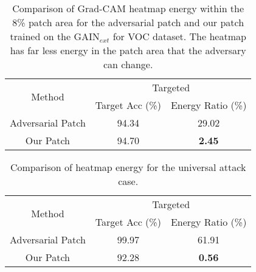 \documentclass[10pt,twocolumn,letterpaper]{article}
\begin{document}
\begin{table}[!t]
\centering
 \begin{tabular}{||c || c | c ||}
 \hline
 \multirow{2}{*}{Method} & \multicolumn{2}{|c|}{Targeted} \\ [0.5ex]
 \cline{2-3}
 & \footnotesize{Target Acc (\%)} & \footnotesize{Energy Ratio (\%)}\\
 \hline\hline
 Adversarial Patch \cite{brown2017adversarial} & 94.34 & 29.02   \\
 \hline
 Our Patch & 94.70 & \textbf{2.45} \\
 \hline
\end{tabular}
\newline
    \caption{Comparison of Grad-CAM heatmap energy within the 8\% patch area for the adversarial patch \cite{brown2017adversarial} and our patch trained on the GAIN{$_{ext}$} \cite{kunpeng2018gain} for VOC dataset. The heatmap has far less energy in the patch area that the adversary can change.
    }
    \label{fig:comparison_patch_heatmap_GAIN}
\end{table}
\begin{table}[!t]
\centering
 \begin{tabular}{||c || c | c ||}
 \hline
 \multirow{2}{*}{Method} & \multicolumn{2}{|c|}{Targeted} \\ [0.5ex]
 \cline{2-3}
 & \footnotesize{Target Acc (\%)} & \footnotesize{Energy Ratio (\%)}\\
 \hline\hline
 Adversarial Patch \cite{brown2017adversarial} &  99.97& 61.91  \\
 \hline
 Our Patch & 92.28 & \textbf{0.56} \\
 \hline
\end{tabular}
\newline
    \caption{Comparison of heatmap energy for the universal attack case.
    }
    \label{fig:comparison_patch_univ_heatmap_GAIN}
\end{table}
\end{document}
